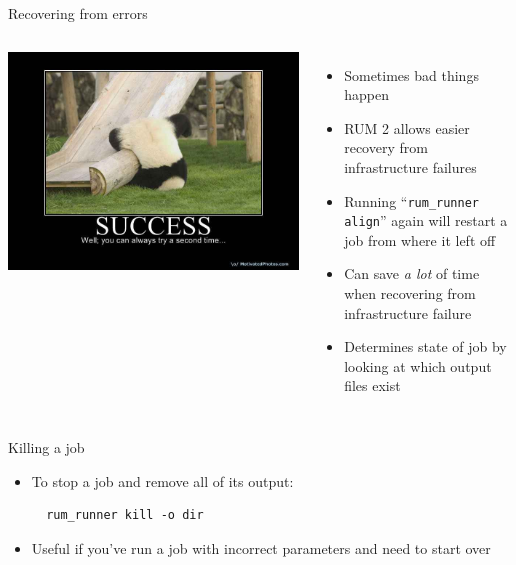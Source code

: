 \documentclass{beamer}
\begin{document}
\begin{frame}{Recovering from errors}
  \begin{columns}[c]
    \column{2.5in}
    \includegraphics[scale=0.2]{success.jpg}
    \column{2.5in}
    \begin{itemize}

    \item Sometimes bad things happen

    \item RUM 2 allows easier recovery from infrastructure failures

    \item Running ``\texttt{rum\_runner align}'' again will restart a
      job from where it left off

    \item Can save \textit{a lot} of time when recovering from infrastructure failure

    \item Determines state of job by looking at which output files exist

    \end{itemize}

  \end{columns}
\end{frame}

\begin{frame}[fragile]{Killing a job}
\begin{itemize}
\item To stop a job and remove all of its output:
\begin{verbatim}
  rum_runner kill -o dir
\end{verbatim}
\item Useful if you've run a job with incorrect parameters and need to start over
\end{itemize}

\end{frame}
\end{document}
